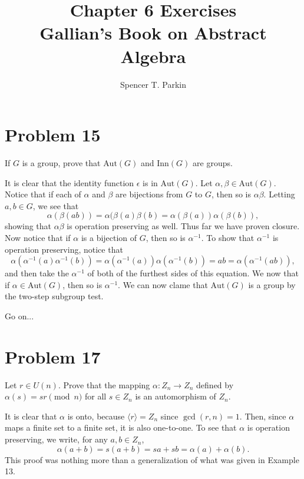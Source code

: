 \documentclass[12pt]{article}
\title{Chapter 6 Exercises\\Gallian's Book on Abstract Algebra}
\author{Spencer T. Parkin}
\newcommand{\aut}{\mbox{Aut}}
\newcommand{\inn}{\mbox{Inn}}
\begin{document}
\maketitle

\section*{Problem 15}

If $G$ is a group, prove that $\aut(G)$ and $\inn(G)$ are groups.

It is clear that the identity function $\epsilon$ is in $\aut(G)$.
Let $\alpha,\beta\in\aut(G)$.  Notice that if each of $\alpha$ and
$\beta$ are bijections from $G$ to $G$, then so is $\alpha\beta$.
Letting $a,b\in G$, we see that
\begin{equation*}
\alpha(\beta(ab))=\alpha(\beta(a)\beta(b)=\alpha(\beta(a))\alpha(\beta(b)),
\end{equation*}
showing that $\alpha\beta$ is operation preserving as well.
Thus far we have proven closure.  Now notice that if $\alpha$ is
a bijection of $G$, then so is $\alpha^{-1}$.  To show that
$\alpha^{-1}$ is operation preserving, notice that
\begin{equation*}
\alpha(\alpha^{-1}(a)\alpha^{-1}(b))=\alpha(\alpha^{-1}(a))\alpha(\alpha^{-1}(b))=ab=\alpha(\alpha^{-1}(ab)),
\end{equation*}
and then take the $\alpha^{-1}$ of both of the furthest sides of this equation.
We now that if $\alpha\in\aut(G)$, then so is $\alpha^{-1}$.  We can now
clame that $\aut(G)$ is a group by the two-step subgroup test.

Go on...

\section*{Problem 17}

Let $r\in U(n)$.  Prove that the mapping $\alpha:Z_n\to Z_n$ defined by
$\alpha(s)=sr\pmod n$ for all $s\in Z_n$ is an automorphism of $Z_n$.

It is clear that $\alpha$ is onto, because $\langle r\rangle=Z_n$ since $\gcd(r,n)=1$.
Then, since $\alpha$ maps a finite set to a finite set, it is also one-to-one.
To see that $\alpha$ is operation preserving, we write, for any $a,b\in Z_n$,
\begin{equation*}
\alpha(a+b) = s(a+b)=sa+sb=\alpha(a)+\alpha(b).
\end{equation*}
This proof was nothing more than a generalization of what was given
in Example 13.
\end{document}

